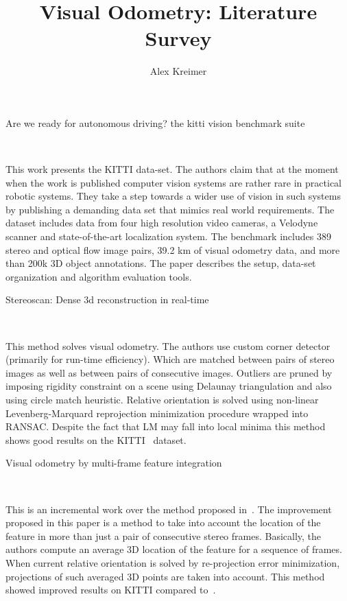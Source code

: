 \documentclass[10pt]{article}         %
\title{Visual Odometry: Literature Survey}
\author{Alex Kreimer}
\begin{document}
\maketitle

\begin{abstract}
\end{abstract}

\begin{enumerate}

  {\Large \item Are we ready for autonomous driving?  the kitti vision
    benchmark suite}~\cite{geiger2012we}

  This work presents the KITTI data-set.  The authors claim that at
  the moment when the work is published computer vision systems are
  rather rare in practical robotic systems.  They take a step towards
  a wider use of vision in such systems by publishing a demanding data
  set that mimics real world requirements.  The dataset includes data
  from four high resolution video cameras, a Velodyne scanner and
  state-of-the-art localization system.  The benchmark includes 389
  stereo and optical flow image pairs, 39.2 km of visual odometry
  data, and more than 200k 3D object annotations.  The paper describes
  the setup, data-set organization and algorithm evaluation tools.

  {\Large \item Stereoscan: Dense 3d reconstruction in
    real-time}~\cite{geiger2011stereoscan}
  
  This method solves visual odometry.  The authors use custom corner
  detector (primarily for run-time efficiency).  Which are matched
  between pairs of stereo images as well as between pairs of
  consecutive images.  Outliers are pruned by imposing rigidity
  constraint on a scene using Delaunay triangulation and also using
  circle match heuristic.  Relative orientation is solved using
  non-linear Levenberg-Marquard reprojection minimization procedure
  wrapped into RANSAC.  Despite the fact that LM may fall into local
  minima this method shows good results on the
  KITTI~\cite{geiger2012we} dataset.

  {\Large \item Visual odometry by multi-frame feature
    integration}~\cite{badino2013visual}

  This is an incremental work over the method proposed
  in~\cite{geiger2011stereoscan}.  The improvement proposed in this
  paper is a method to take into account the location of the feature
  in more than just a pair of consecutive stereo frames.  Basically,
  the authors compute an average 3D location of the feature for a
  sequence of frames.  When current relative orientation is solved by
  re-projection error minimization, projections of such averaged 3D
  points are taken into account.  This method showed improved results
  on KITTI compared to~\cite{geiger2011stereoscan}.


\end{enumerate}
\end{document}
